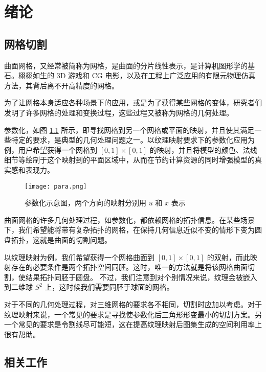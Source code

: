 
\chapter{绪论}

\section{网格切割}

曲面网格，又经常被简称为网格，是曲面的分片线性表示，是计算机图形学的基石。栩栩如生的 3D 游戏和 CG 电影，以及在工程上广泛应用的有限元物理仿真方法，其背后离不开高精度的网格。

为了让网格本身适应各种场景下的应用，或是为了获得某些网格的变体，研究者们发明了许多网格的处理和变换过程，这些过程又被称为网格的几何处理。

参数化，如图 \ref{fig:texmapping} 所示，即寻找网格到另一个网格或平面的映射，并且使其满足一些特定的要求，是典型的几何处理问题之一\cite{Floater1997}。以纹理映射要求下的参数化应用为例，用户希望获得一个网格到 $ [0, 1] \times [0, 1] $ 的映射，并且将模型的颜色、法线细节等绘制于这个映射到的平面区域中，从而在节约计算资源的同时增强模型的真实感和表现力\cite{wikitexturemapping}。

\begin{figure}[h]
    \centering
    \texttt{[image: para.png]}
    \caption{参数化示意图，两个方向的映射分别用 $u$ 和 $x$ 表示}
    \label{fig:texmapping}
\end{figure}

曲面网格的许多几何处理过程，如参数化，都依赖网格的拓扑信息。在某些场景下，我们希望能将带有复杂拓扑的网格，在保持几何信息近似不变的情形下变为圆盘拓扑，这就是曲面的切割问题。

以纹理映射为例，我们希望获得一个网格曲面到 $ [0, 1] \times [0, 1] $ 的双射，而此映射存在的必要条件是两个拓扑空间同胚。这时，唯一的方法就是将该网格曲面切割，使结果拓扑同胚于圆盘。\cite{Erickson2002} 不过，我们注意到对个别情况来说，纹理会被嵌入到二维球 $ S^2 $ 上，这时候我们需要同胚于球面的网格\cite{Haker2000}。

对于不同的几何处理过程，对三维网格的要求各不相同，切割时应加以考虑。对于纹理映射来说，一个常见的要求是寻找使参数化后三角形形变最小的切割方案\cite{Floater1997}\cite{Gu2002}。另一个常见的要求是令割线尽可能短，这在提高纹理映射后图集生成的空间利用率上很有帮助\cite{atlasgen}。

\section{相关工作}

